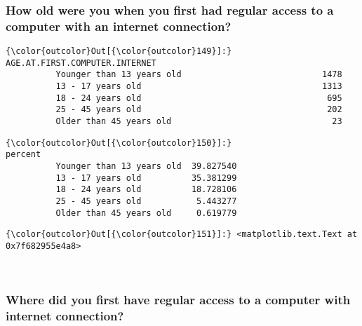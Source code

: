 \documentclass[11pt]{article}
\begin{document}
    \subsubsection{How old were you when you first had regular access to a
computer with an internet
connection?}\label{how-old-were-you-when-you-first-had-regular-access-to-a-computer-with-an-internet-connection}


            \begin{Verbatim}[commandchars=\\\{\}]
{\color{outcolor}Out[{\color{outcolor}149}]:}                            AGE.AT.FIRST.COMPUTER.INTERNET
          Younger than 13 years old                            1478
          13 - 17 years old                                    1313
          18 - 24 years old                                     695
          25 - 45 years old                                     202
          Older than 45 years old                                23
\end{Verbatim}
        

            \begin{Verbatim}[commandchars=\\\{\}]
{\color{outcolor}Out[{\color{outcolor}150}]:}                              percent
          Younger than 13 years old  39.827540
          13 - 17 years old          35.381299
          18 - 24 years old          18.728106
          25 - 45 years old           5.443277
          Older than 45 years old     0.619779
\end{Verbatim}
        

            \begin{Verbatim}[commandchars=\\\{\}]
{\color{outcolor}Out[{\color{outcolor}151}]:} <matplotlib.text.Text at 0x7f682955e4a8>
\end{Verbatim}
        
    \begin{center}
    \end{center}
    { \hspace*{\fill} \\}
    

    \subsubsection{Where did you first have regular access to a computer
with internet
connection?}\label{where-did-you-first-have-regular-access-to-a-computer-with-internet-connection}
\end{document}
